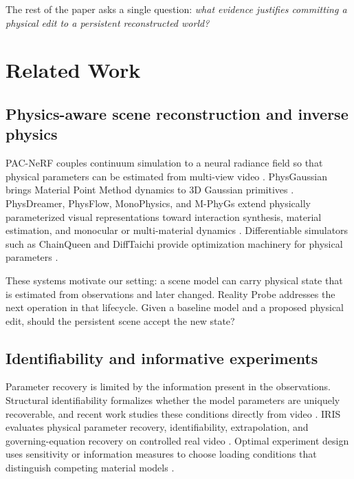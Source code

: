 \documentclass[acmtog]{acmart}
\begin{document}
The rest of the paper asks a single question: \emph{what evidence justifies committing a physical edit to a persistent reconstructed world?}

\section{Related Work}\label{related-work}

\subsection{Physics-aware scene reconstruction and inverse physics}\label{physics-aware-scene-representations-and-inverse-physics}

PAC-NeRF couples continuum simulation to a neural radiance field so that physical parameters can be estimated from multi-view video \citep{li2023pacnerf}. PhysGaussian brings Material Point Method dynamics to 3D Gaussian primitives \citep{xie2024physgaussian}. PhysDreamer, PhysFlow, MonoPhysics, and M-PhyGs extend physically parameterized visual representations toward interaction synthesis, material estimation, and monocular or multi-material dynamics \citep{zhang2024physdreamer,liu2025physflow,rho2026monophysics,wada2026mphygs}. Differentiable simulators such as ChainQueen and DiffTaichi provide optimization machinery for physical parameters \citep{hu2019chainqueen,hu2020difftaichi}.

These systems motivate our setting: a scene model can carry physical state that is estimated from observations and later changed. Reality Probe addresses the next operation in that lifecycle. Given a baseline model and a proposed physical edit, should the persistent scene accept the new state?

\subsection{Identifiability and informative experiments}\label{identifiability-and-experimental-design}

Parameter recovery is limited by the information present in the observations. Structural identifiability formalizes whether the model parameters are uniquely recoverable, and recent work studies these conditions directly from video \citep{wang2026identifiability}. IRIS evaluates physical parameter recovery, identifiability, extrapolation, and governing-equation recovery on controlled real video \citep{khanbayov2026iris}. Optimal experiment design uses sensitivity or information measures to choose loading conditions that distinguish competing material models \citep{asadi2025oed}.
\end{document}
